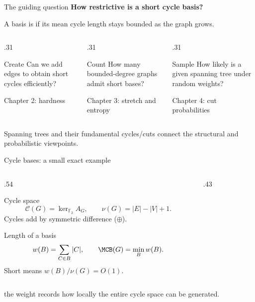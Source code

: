 \begin{frame}{The guiding question}
 \centering
 {\Large\bfseries How restrictive is a short cycle basis?}\par\vspace{.23cm}
 A basis is  if its mean cycle length stays bounded as the graph grows.
 \vspace{.40cm}
 \begin{columns}[T,onlytextwidth]
  \begin{column}{.31\textwidth}
   \begin{block}{Create}
    Can we add edges to obtain short cycles efficiently?
   \end{block}
   \centering\small Chapter 2: hardness
  \end{column}
  \begin{column}{.31\textwidth}
   \begin{block}{Count}
    How many bounded-degree graphs admit short bases?
   \end{block}
   \centering\small Chapter 3: stretch and entropy
  \end{column}
  \begin{column}{.31\textwidth}
   \begin{block}{Sample}
    How likely is a given spanning tree under random weights?
   \end{block}
   \centering\small Chapter 4: cut probabilities
  \end{column}
 \end{columns}
 \vspace{.30cm}
 \small\textcolor{thesisGray}{Spanning trees and their fundamental cycles/cuts connect the structural and probabilistic viewpoints.}
\end{frame}


\begin{frame}{Cycle bases: a small exact example}
 \begin{columns}[c,onlytextwidth]
  \begin{column}{.54\textwidth}
   \begin{block}{Cycle space}
     \[\mathcal C(G)=\ker_{\mathbb F_2}A_G,\qquad \nu(G)=|E|-|V|+1.\]
     Cycles add by symmetric difference ($\oplus$).
   \end{block}
   \begin{block}{Length of a basis}
     \[w(B)=\sum_{C\in B}|C|,\qquad \MCB(G)=\min_B w(B).\]
     Short means $w(B)/\nu(G)=O(1)$.
   \end{block}
  \end{column}
  \begin{column}{.43\textwidth}
   \centering\resizebox{.75\linewidth}{!}{\ShortBasisFig}
  \end{column}
 \end{columns}
 \vspace{.1cm}
 \small{} the weight records how locally the entire cycle space can be generated.
\end{frame}


